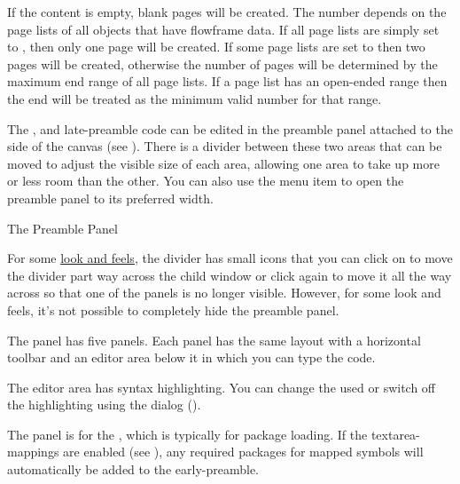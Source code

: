 If the  content is empty,
blank pages will be created. The number depends on the page lists of
all objects that have \gls{flowframe} data. If all page lists are
simply set to , then only one page will be created. If some
page lists are set to  then two pages will be created,
otherwise the number of pages will be determined by the maximum end
range of all page lists.  If a page list has an open-ended range
then the end will be treated as the minimum valid number for that
range.


The ,  and
\gls{late-preamble} code can be edited in the
\gls{preamble} panel attached to the side of the
\gls{canvas} (see ). There is a
divider between these two areas that can be moved to adjust the
visible size of each area, allowing one area to take up more or less
room than the other. You can also use the 
menu item to open the preamble panel to its preferred width.

{}
{The Preamble Panel}

For some \hyperref[sec:lookandfeel]{look and feels}, the
divider has small icons that you can click on to move the divider
part way across the child window or click again to move it all the
way across so that one of the panels is no longer visible. However,
for some look and feels, it's not possible to completely hide the
preamble panel.


The  panel has five panels.
Each panel has the same layout with a horizontal toolbar and an
editor area below it in which you can type the code. 

The editor area has syntax highlighting. You can change the
 used or switch off the highlighting using the
 dialog ().


The  panel is for the 
, which is typically for package
loading. If the \glspl{textarea-mapping} are enabled (see
), any
required packages for mapped symbols will automatically be
added to the \gls{early-preamble}.


